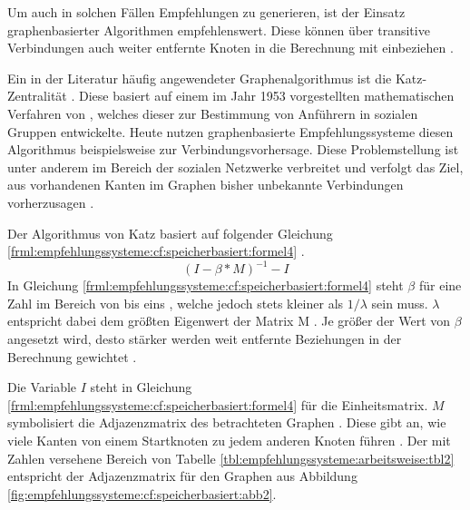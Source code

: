 Um auch in solchen Fällen Empfehlungen zu generieren, ist der Einsatz graphenbasierter Algorithmen empfehlenswert. Diese können über transitive Verbindungen auch weiter entfernte Knoten in die Berechnung mit einbeziehen \cite[S. 60f.]{recommenderSystems:2016}.

Ein in der Literatur häufig angewendeter Graphenalgorithmus ist die Katz-Zentralität \cite[S. 6]{guns:2014}\cite[S. 1f.]{huang:2004}\cite[S. 1ff.]{zhan:2017}. Diese basiert auf einem im Jahr 1953 vorgestellten mathematischen Verfahren von \textcite[S. 1ff.]{katz:1953}, welches dieser zur Bestimmung von Anführern in sozialen Gruppen entwickelte. Heute nutzen graphenbasierte Empfehlungssysteme diesen Algorithmus beispielsweise zur Verbindungsvorhersage. Diese Problemstellung ist unter anderem im Bereich der sozialen Netzwerke verbreitet und verfolgt das Ziel, aus vorhandenen Kanten im Graphen bisher unbekannte Verbindungen vorherzusagen \cite[S. 1ff.]{libenNowell:2007}.

Der Algorithmus von Katz basiert auf folgender Gleichung \ref{frml:empfehlungssysteme:cf:speicherbasiert:formel4} \cite[S. 4]{libenNowell:2007}.
\begin{equation}
	(I - \beta * M)^{-1} - I
	\label{frml:empfehlungssysteme:cf:speicherbasiert:formel4}
\end{equation}
In Gleichung \ref{frml:empfehlungssysteme:cf:speicherbasiert:formel4} steht $\beta$ für eine Zahl im Bereich von \nullWert bis eins \cite[S. 6]{guns:2014}, welche jedoch stets kleiner als $1/\lambda$ sein muss. $\lambda$ entspricht dabei dem größten Eigenwert der Matrix M \cite[S. 6]{zhan:2017}. Je größer der Wert von $\beta$ angesetzt wird, desto stärker werden weit entfernte Beziehungen in der Berechnung gewichtet \cite[S. 6]{guns:2014}.

Die Variable $I$ steht in Gleichung \ref{frml:empfehlungssysteme:cf:speicherbasiert:formel4} für die Einheitsmatrix. $M$ symbolisiert die Adjazenzmatrix des betrachteten Graphen \cite[S. 4]{libenNowell:2007}. Diese gibt an, wie viele Kanten von einem Startknoten zu jedem anderen Knoten führen \cite[S. 6]{guns:2014}. Der mit Zahlen versehene Bereich von Tabelle \ref{tbl:empfehlungssysteme:arbeitsweise:tbl2} entspricht der Adjazenzmatrix für den Graphen aus Abbildung \ref{fig:empfehlungssysteme:cf:speicherbasiert:abb2}.


